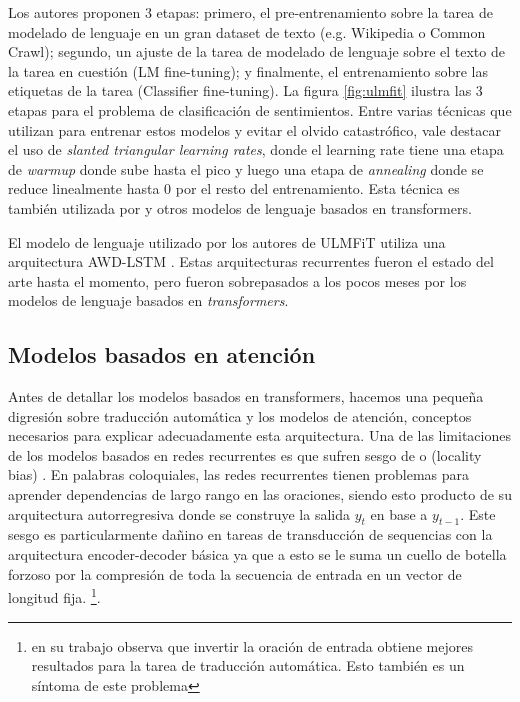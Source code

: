 Los autores proponen 3 etapas: primero, el pre-entrenamiento sobre la tarea de modelado de lenguaje en un gran dataset de texto (e.g. Wikipedia o Common Crawl); segundo, un ajuste de la tarea de modelado de lenguaje sobre el texto de la tarea en cuestión (LM fine-tuning); y finalmente, el entrenamiento sobre las etiquetas de la tarea (Classifier fine-tuning). La figura \ref{fig:ulmfit} ilustra las 3 etapas para el problema de clasificación de sentimientos. Entre varias técnicas que utilizan para entrenar estos modelos y evitar el olvido catastrófico, vale destacar el uso de \emph{slanted triangular learning rates}, donde el learning rate tiene una etapa de \emph{warmup} donde sube hasta el pico y luego una etapa de \emph{annealing} donde se reduce linealmente hasta 0 por el resto del entrenamiento. Esta técnica es también utilizada por \bert{} y otros modelos de lenguaje basados en transformers.

El modelo de lenguaje utilizado por los autores de ULMFiT utiliza una arquitectura AWD-LSTM \cite{merity2018regularizing}. Estas arquitecturas recurrentes fueron el estado del arte hasta el momento, pero fueron sobrepasados a los pocos meses por los modelos de lenguaje basados en \emph{transformers}.


\subsection{Modelos basados en atención}
\label{sec:02_transformers}

Antes de detallar los modelos basados en transformers, hacemos una pequeña digresión sobre traducción automática y los modelos de atención, conceptos necesarios para explicar adecuadamente esta arquitectura. Una de las limitaciones de los modelos basados en redes recurrentes es que sufren sesgo de  o  (locality bias) \cite{battaglia2018relational}. En palabras coloquiales, las redes recurrentes tienen problemas para aprender dependencias de largo rango en las oraciones, siendo esto producto de su arquitectura autorregresiva donde se construye la salida $y_t$ en base a $y_{t-1}$. Este sesgo es particularmente dañino en tareas de transducción de sequencias con la arquitectura encoder-decoder básica ya que a esto se le suma un cuello de botella forzoso por la compresión de toda la secuencia de entrada en un vector de longitud fija. \footnote{\citet{sutskever2014sequence} en su trabajo observa que invertir la oración de entrada obtiene mejores resultados para la tarea de traducción automática. Esto también es un síntoma de este problema}.


